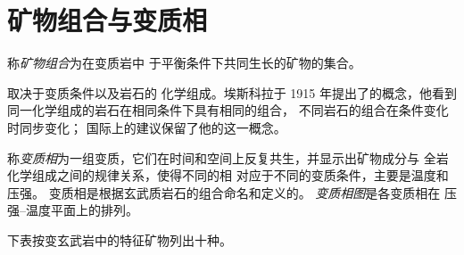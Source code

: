 \section{矿物组合与变质相}\label{sec:b2:metamorphic-facies:facies}

\begin{definition}[矿物组合]\label{def:b2:metamorphic-facies:assemblage}
称\emph{矿物组合}为在变质岩中
于平衡条件下共同生长的矿物的集合。
\end{definition}

取决于变质条件以及岩石的
化学组成。埃斯科拉于 1915 年提出了的概念，他看到
同一化学组成的岩石在相同条件下具有相同的组合，
不同岩石的组合在条件变化时同步变化；
国际上的建议保留了他的这一概念。

\begin{definition}\label{def:b2:metamorphic-facies:facies}
称\emph{变质相}为一组变质，它们在时间和空间上反复共生，并显示出矿物成分与
全岩化学组成之间的规律关系，使得不同的相
对应于不同的变质条件，主要是温度和压强。
变质相是根据玄武质岩石的组合命名和定义的。
\emph{变质相图}是各变质相在
压强–温度平面上的排列。
\end{definition}

下表按变玄武岩中的特征矿物列出十种。

